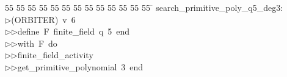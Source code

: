 %
%
\begin{tabbing}
55 \= 55 \= 55 \= 55 \= 55 \= 55 \= 55 \= 55 \= 55 \= 55 \= 55 \= 55 \= 55 \= \kill
search\_primitive\_poly\_q5\_deg3:\\[0pt]
$\triangleright$\>(ORBITER)\ v\ 6\ \\[0pt]
$\triangleright$\>$\triangleright$\>define\ F\ finite\_field\ q\ 5\ end\ \\[0pt]
$\triangleright$\>$\triangleright$\>with\ F\ do\ \\[0pt]
$\triangleright$\>$\triangleright$\>finite\_field\_activity\ \\[0pt]
$\triangleright$\>$\triangleright$\>get\_primitive\_polynomial\ 3\ end\\[0pt]
\end{tabbing}
